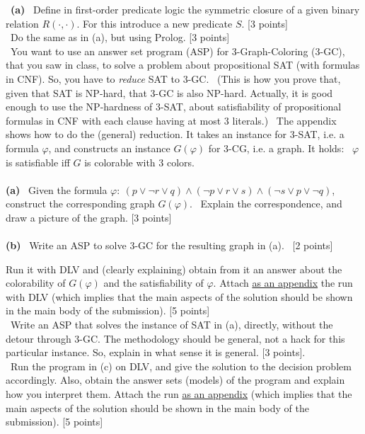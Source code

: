 \documentclass[12pt,fullpage]{article}
\begin{document}
 \ {\bf (a)} \ Define in first-order predicate logic the symmetric closure of a given binary relation $R(\cdot, \cdot)$. For this introduce a new predicate $S$. \hfill [3 points]\\

 \ Do the same as in (a), but using Prolog. \hfill [3 points]\\

 \ You want to use an answer set program (ASP) for 3-Graph-Coloring (3-GC), that you saw in class, to solve a problem about propositional SAT (with formulas in CNF). So, you have to {\em reduce} SAT to 3-GC. \ (This is how you prove that, given that SAT is NP-hard, that 3-GC is also NP-hard. Actually, it is good enough to use the NP-hardness of 3-SAT, about satisfiability of propositional formulas in CNF with each clause having at most  3 literals.) \ The appendix shows how to do the (general) reduction. It takes an instance for 3-SAT, i.e. a formula $\varphi$,  and constructs an instance $G(\varphi)$ for 3-CG, i.e. a graph. It holds: \ $\varphi$ is satisfiable iff $G$ is colorable with 3 colors.\\
\\
{\bf (a)} \ Given the formula $\varphi\!: \ (p \vee \neg r \vee q) \wedge (\neg p \vee r \vee s) \wedge (\neg s \vee p \vee \neg q)$, construct the corresponding graph $G(\varphi)$. \ Explain the correspondence, and draw a picture of the graph. \hfill [3 points]\\
\\
{\bf (b)} \ Write an ASP to solve 3-GC for the resulting graph in (a). \ [2 points] 

Run it with DLV and (clearly explaining) obtain  from it an answer about the colorability of $G(\varphi)$ and the satisfiability of $\varphi$.  Attach \underline{as an appendix} the run with DLV (which implies that the main aspects of the solution should be shown in the main body of the submission). \hfill [5 points]\\

 \ Write an ASP that solves the instance of SAT in (a), directly,  without the detour through 3-GC. The methodology should be general, not a hack for this particular instance. So, explain in what sense it is general. \hfill
[3 points]. \\
 
 \ Run the program in (c) on DLV, and give the solution to the decision problem accordingly. Also, obtain the answer sets (models) of the program and explain how you interpret them. Attach the run \underline{as an appendix} (which implies that the main aspects of the solution should be shown in the main body of the submission). \hfill [5 points]
\end{document}
